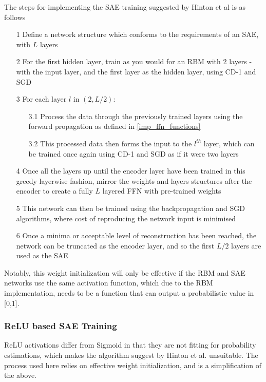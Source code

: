 \documentclass[a4paper,11pt,oneside]{article}
\theoremstyle{plain}
\theoremstyle{definition}
\begin{document}
The steps for implementing the SAE training suggested by Hinton et al \cite{Hinton2} is as follows

\begin{itemize}
	\item [1] Define a network structure which conforms to the requirements of an SAE, with $L$ layers
	\item [2] For the first hidden layer, train as you would for an RBM with 2 layers - with the input layer, and the first layer as the hidden layer, using CD-1 and SGD
	\item [3] For each layer $l$ in $(2, L/2)$:
	\begin{itemize}
		\item [3.1] Process the data through the previously trained layers using the forward propagation as defined in \ref{imp_ffn_functions}
		\item [3.2] This processed data then forms the input to the $l^{th}$ layer, which can be trained once again using CD-1 and SGD as if it were two layers
	\end{itemize}
	\item[4] Once all the layers up until the encoder layer have been trained in this greedy layerwise fashion, mirror the weights and layers structures after the encoder to create a fully $L$ layered FFN with pre-trained weights
	\item [5] This network can then be trained using the backpropagation and SGD algorithms, where cost of reproducing the network input is minimised
	\item [6] Once a minima or acceptable level of reconstruction has been reached, the network can be truncated as the encoder layer, and so the first $L/2$ layers are used as the SAE
\end{itemize}

Notably, this weight initialization will only be effective if the RBM and SAE networks use the same activation function, which due to the RBM implementation, needs to be a function that can output a probabilistic value in [0,1].

\subsubsection{ReLU based SAE Training}\label{imp_relusae}

ReLU activations differ from Sigmoid in that they are not fitting for probability estimations, which makes the algorithm suggest by Hinton et al. unsuitable. The process used here relies on effective weight initialization, and is a simplification of the above.
\end{document}
